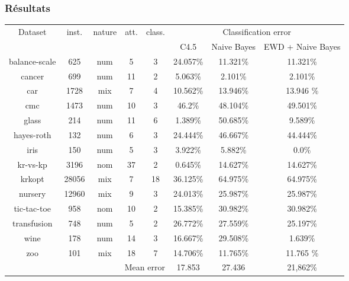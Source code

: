 \begin{frame}
 \frametitle{Résultats}
\begin{center}
\begin{footnotesize}
 
\begin{agrandirmarges}{1cm}{2cm}
 
 
\begin{tabular}{|c|c|c|c|c|c|c|c|}
\hline
Dataset & inst. & nature & att. & class. & \multicolumn{3}{c|}{ Classification error } \\
\cline{6-8}
& & & & & C4.5 & Naive Bayes & EWD + Naive Bayes \\
\hline
balance-scale&625&num&5&3&24.057\%&11.321\% & 11.321\% \\
\hline
cancer&699&num&11&2&5.063\%&2.101\% & 2.101\% \\
\hline
car&1728&mix&7&4&10.562\%&13.946\% & 13.946 \% \\
\hline
cmc&1473&num&10&3&46.2\%&48.104\% &  49.501\% \\
\hline
glass&214&num&11&6&1.389\%&50.685\% &  9.589\% \\
\hline
hayes-roth&132&num&6&3&24.444\%&46.667\% &  44.444\% \\
\hline
iris&150&num&5&3&3.922\%&5.882\% &  0.0\% \\
\hline
kr-vs-kp&3196&nom&37&2&0.645\%&14.627\% &  14.627\% \\
\hline
krkopt&28056&mix&7&18&36.125\%&64.975\% &  64.975\% \\
\hline
nursery&12960&mix&9&3&24.013\%&25.987\% &  25.987\% \\
\hline
tic-tac-toe&958&nom&10&2&15.385\%&30.982\% &  30.982\% \\
\hline
transfusion&748&num&5&2&26.772\%&27.559\% &  25.197\% \\
\hline
wine&178&num&14&3&16.667\%&29.508\% &  1.639\% \\
\hline
zoo&101&mix&18&7&14.706\%&11.765\% & 11.765 \% \\
\hline
\multicolumn{5}{|r|}{ Mean error } & 17.853 & 27.436 & 21,862\% \\
\hline
\end{tabular}

\end{agrandirmarges}
\end{footnotesize}

\end{center}

\end{frame}
